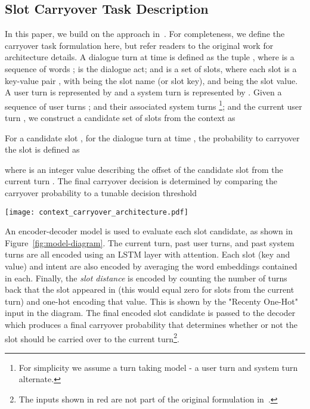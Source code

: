\documentclass[11pt,a4paper]{article}
\begin{document}
\subsection{Slot Carryover Task Description}
\label{ssec:sc}
In this paper, we build on the approach in~\citep{cc-inter}. For completeness, we define the carryover task formulation here, but refer readers to the original work for architecture details.  A dialogue turn at time  is defined as the tuple , where  is  a sequence of words ;
 is the dialogue act; and  is a set of slots, where each slot  is a key-value pair , with  being the slot name (or slot key), 
and  being the slot value. A user turn is represented by  and a system turn is represented by . Given a sequence of  user turns ;
and their associated system turns \footnote{For simplicity we assume a turn taking model - a user turn and system turn alternate.};
and the current user turn , we  construct a candidate set of slots from the context as 

For a candidate slot , for the dialogue turn at time , the probability to carryover the slot is defined as

where  is an integer value describing the offset of the candidate slot from the current turn .
The final carryover decision is determined by comparing the carryover probability to a tunable decision threshold

\begin{figure*}[ht]
\begin{center}
\texttt{[image: context\_carryover\_architecture.pdf]}
\caption{Slot carryover architecture from~\cite{cc-inter} augmented with a temporal component using domain-specific time masking as described in Section \ref{sssec:tm-d}.
}
\label{fig:model-diagram}
\end{center}
\end{figure*}

An encoder-decoder model is used to evaluate each slot candidate, as shown in Figure~\ref{fig:model-diagram}. The current turn, past user turns, and past system turns are all encoded using an LSTM layer with attention. Each slot (key and value) and intent are also encoded by averaging the word embeddings contained in each. Finally, the \textit{slot distance} is encoded by counting the number of turns back that the slot appeared in (this would equal zero for slots from the current turn) and one-hot encoding that value. This is shown by the "Recenty One-Hot" input in the diagram. The final encoded slot candidate is passed to the decoder which produces a final carryover probability that determines whether or not the slot should be carried over to the current turn\footnote{The inputs shown in red are not part of the original formulation in~\citep{cc-inter}.}.
\end{document}
